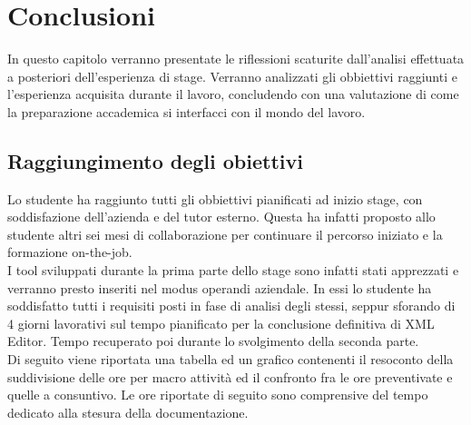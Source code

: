 
\chapter{Conclusioni}
\label{cap:conclusioni}

In questo capitolo verranno presentate le riflessioni scaturite dall'analisi effettuata a posteriori dell'esperienza di stage. Verranno analizzati gli obbiettivi raggiunti e l'esperienza acquisita durante il lavoro, concludendo con una valutazione di come la preparazione accademica si interfacci con il mondo del lavoro.

\section{Raggiungimento degli obiettivi}

Lo studente ha raggiunto tutti gli obbiettivi pianificati ad inizio stage, con soddisfazione dell'azienda e del tutor esterno. Questa ha infatti proposto allo studente altri sei mesi di collaborazione per continuare il percorso iniziato e la formazione on-the-job.\\

I tool sviluppati durante la prima parte dello stage sono infatti stati apprezzati e verranno presto inseriti nel modus operandi aziendale. In essi lo studente ha soddisfatto tutti i requisiti posti in fase di analisi degli stessi, seppur sforando di 4 giorni lavorativi sul tempo pianificato per la conclusione definitiva di XML Editor. Tempo recuperato poi durante lo svolgimento della seconda parte.\\

Di seguito viene riportata una tabella ed un grafico contenenti il resoconto della suddivisione delle ore per macro attività ed il confronto fra le ore preventivate e quelle a consuntivo. Le ore riportate di seguito sono comprensive del tempo dedicato alla stesura della documentazione.

